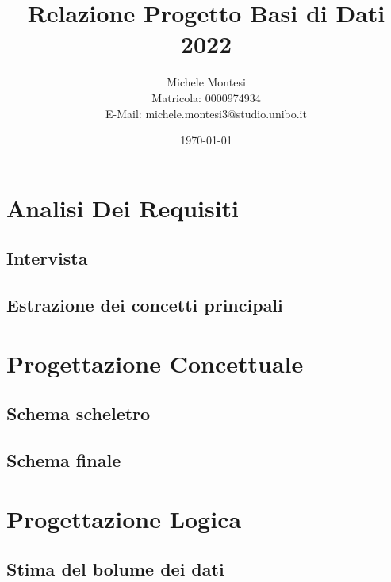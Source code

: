\documentclass[a4paper, 12pt]{report}
\title{Relazione Progetto Basi di Dati 2022}
\author{Michele Montesi \\
        Matricola: 0000974934 \\
        E-Mail: michele.montesi3@studio.unibo.it}
\date{\today}
\begin{document}
    
\maketitle
\tableofcontents

\chapter[]{Analisi Dei Requisiti}

\section[]{Intervista}

\section[]{Estrazione dei concetti principali}

\chapter[]{Progettazione Concettuale}

\section[]{Schema scheletro}

\section[]{Schema finale}

\chapter[]{Progettazione Logica}

\section[]{Stima del bolume dei dati}
\end{document}
